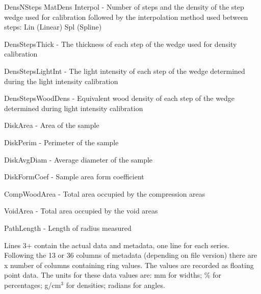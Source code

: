 \documentclass[10pt, headsepline,DIV14,BCOR0.5cm]{scrreprt}
\begin{document}
\begin{itemize*}
DensNSteps MatDens Interpol - Number of steps and the density of the step wedge used for calibration followed by the interpolation method used between steps: Lin (Linear) Spl (Spline)
\item 

DensStepsThick - The thickness of each step of the wedge used for density calibration
\item 

DensStepsLightInt - The light intensity of each step of the wedge determined during the light intensity calibration
\item 

DensStepsWoodDens - Equivalent wood density of each step of the wedge determined during light intensity calibration
\item 

DiskArea - Area of the sample
\item 

DiskPerim - Perimeter of the sample
\item 

DiskAvgDiam - Average diameter of the sample
\item 

DiskFormCoef - Sample area form coefficient
\item 

CompWoodArea - Total area occupied by the compression areas
\item 

VoidArea - Total area occupied by the void areas
\item 

PathLength - Length of radius measured 
\end{itemize*}

Lines 3+ contain the actual data and metadata, one line for each series. Following the 13 or 36 columns of metadata (depending on file version) there are x number of columns containing ring values. The values are recorded as floating point data. The units for these data values are: mm for widths; \% for percentages; g/cm$^3$ for densities; radians for angles. 




\end{document}
